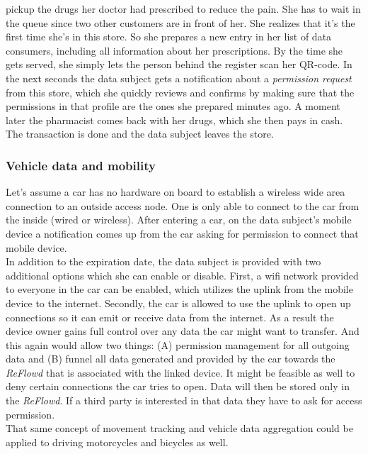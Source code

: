 \documentclass[12pt,english,a4paper,titlepage,cleardoublepage=empty,dottedtoc]{report}
\begin{document}
pickup the drugs her doctor had prescribed to reduce the pain. She has
to wait in the queue since two other customers are in front of her. She
realizes that it's the first time she's in this store. So she prepares a
new entry in her list of data consumers, including all information about
her prescriptions. By the time she gets served, she simply lets the
person behind the register scan her QR-code. In the next seconds the
data subject gets a notification about a \emph{permission request} from
this store, which she quickly reviews and confirms by making sure that
the permissions in that profile are the ones she prepared minutes ago. A
moment later the pharmacist comes back with her drugs, which she then
pays in cash. The transaction is done and the data subject leaves the
store.

\subsubsection*{Vehicle data and
mobility}\label{vehicle-data-and-mobility}

Let's assume a car has no hardware on board to establish a wireless wide
area connection to an outside access node. One is only able to connect
to the car from the inside (wired or wireless). After entering a car, on
the data subject's mobile device a notification comes up from the car
asking for permission to connect that mobile device.\\
In addition to the expiration date, the data subject is provided with
two additional options which she can enable or disable. First, a wifi
network provided to everyone in the car can be enabled, which utilizes
the uplink from the mobile device to the internet. Secondly, the car is
allowed to use the uplink to open up connections so it can emit or
receive data from the internet. As a result the device owner gains full
control over any data the car might want to transfer. And this again
would allow two things: (A) permission management for all outgoing data
and (B) funnel all data generated and provided by the car towards the
\emph{ReFlowd} that is associated with the linked device. It might be
feasible as well to deny certain connections the car tries to open. Data
will then be stored only in the \emph{ReFlowd}. If a third party is
interested in that data they have to ask for access permission.\\
That same concept of movement tracking and vehicle data aggregation
could be applied to driving motorcycles and bicycles as well.
\end{document}
